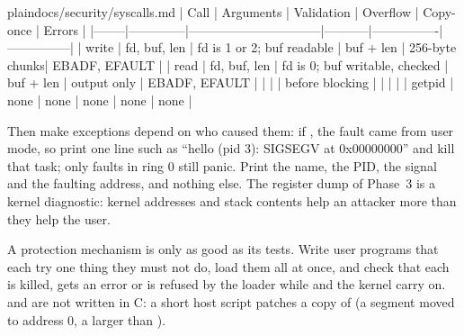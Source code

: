 \documentclass[11pt,a4paper]{article}
\begin{document}
\begin{lst}{plain}{docs/security/syscalls.md}
| Call   | Arguments    | Validation                     | Overflow  | Copy-once      | Errors        |
|--------|--------------|--------------------------------|-----------|----------------|---------------|
| write  | fd, buf, len | fd is 1 or 2; buf readable     | buf + len | 256-byte chunks| EBADF, EFAULT |
| read   | fd, buf, len | fd is 0; buf writable, checked | buf + len | output only    | EBADF, EFAULT |
|        |              | before blocking                |           |                |               |
| getpid | none         | none                           | none      | none           | none          |
\end{lst}

Then make exceptions depend on who caused them: if , the fault came from user mode, so print one
line such as ``hello (pid 3): SIGSEGV at 0x00000000'' and kill that task; only faults in ring 0 still panic. Print the
name, the PID, the signal and the faulting address, and nothing else. The register dump of Phase~3 is a kernel
diagnostic: kernel addresses and stack contents help an attacker more than they help the user.

A protection mechanism is only as good as its tests. Write user programs that each try one thing they must not do,
load them all at once, and check that each is killed, gets an error or is refused by the loader while  and
the kernel carry on.  and  are not written in C: a short host script patches a copy of
 (a segment moved to address 0, a  larger than ).
\end{document}
